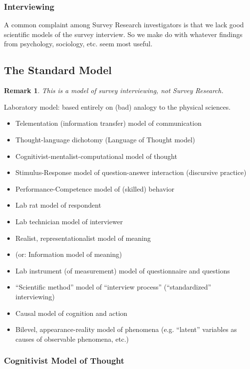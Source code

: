\documentclass[11pt,twoside]{article}
\newtheorem{remark}{Remark}
\newcommand{\SM}{Standard Model}
\newcommand{\SR}{Survey Research}
\begin{document}
\subsubsection{Interviewing}

A common complaint among \SR{} investigators is that we lack good
scientific models of the survey interview.  So we make do with
whatever findings from psychology, sociology, etc. seem most useful.

\subsection{The \SM{}}

\begin{remark}
  This is a model of survey interviewing, not \SR{}.
\end{remark}

Laboratory model: based entirely on (bad) analogy to the physical
sciences.

\begin{itemize}
\item Telementation (information transfer) model of communication
\item Thought-language dichotomy (Language of Thought model)
\item Cognitivist-mentalist-computational model of thought
\item Stimulus-Response model of question-answer interaction (discursive practice)
\item Performance-Competence model of (skilled) behavior
\item Lab rat model of respondent
\item Lab technician model of interviewer
\item Realist, representationalist model of meaning
\item (or: Information model of meaning)
\item Lab instrument (of measurement) model of questionnaire and questions
\item ``Scientific method'' model of ``interview process''
  (``standardized'' interviewing)
\item Causal model of cognition and action
\item Bilevel, appearance-reality model of phenomena (e.g. ``latent'' variables
  as causes of observable phenomena, etc.)
\end{itemize}

\subsubsection{Cognitivist Model of Thought}
\end{document}
